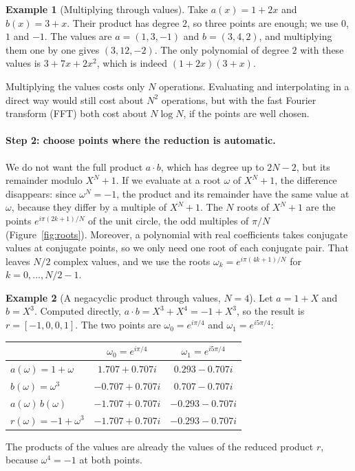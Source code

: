 \documentclass[12pt]{article}
\theoremstyle{plain}
\theoremstyle{definition}
\newtheorem{example}{Example}
\begin{document}
\begin{example}[Multiplying through values]
Take $a(x)=1+2x$ and $b(x)=3+x$. Their product has degree $2$, so three points
are enough; we use $0$, $1$ and $-1$. The values are $a=(1,3,-1)$ and
$b=(3,4,2)$, and multiplying them one by one gives $(3,12,-2)$. The only
polynomial of degree $2$ with these values is $3+7x+2x^2$, which is indeed
$(1+2x)(3+x)$.
\end{example}

Multiplying the values costs only $N$ operations. Evaluating and interpolating
in a direct way would still cost about $N^2$ operations, but with the fast
Fourier transform (FFT) \cite{cooley1965fft} both cost about $N\log N$, if the
points are well chosen.

\paragraph{Step 2: choose points where the reduction is automatic.}
We do not want the full product $a\cdot b$, which has degree up to $2N-2$, but
its remainder modulo $X^N+1$. If we evaluate at a root $\omega$ of $X^N+1$, the
difference disappears: since $\omega^N=-1$, the product and its remainder have
the same value at $\omega$, because they differ by a multiple of $X^N+1$. The
$N$ roots of $X^N+1$ are the points $e^{i\pi(2k+1)/N}$ of the unit circle, the
odd multiples of $\pi/N$ (Figure~\ref{fig:roots}). Moreover, a polynomial with
real coefficients takes conjugate values at conjugate points, so we only need
one root of each conjugate pair. That leaves $N/2$ complex values, and we use
the roots $\omega_k=e^{i\pi(4k+1)/N}$ for $k=0,\dots,N/2-1$.



\begin{example}[A negacyclic product through values, $N=4$]
Let $a=1+X$ and $b=X^3$. Computed directly, $a\cdot b=X^3+X^4=-1+X^3$, so the
result is $r=[-1,0,0,1]$. The two points are $\omega_0=e^{i\pi/4}$ and
$\omega_1=e^{i5\pi/4}$:
\begin{center}
\small
\begin{tabular}{@{}lcc@{}}
\toprule
 & $\omega_0=e^{i\pi/4}$ & $\omega_1=e^{i5\pi/4}$\\
\midrule
$a(\omega)=1+\omega$ & $1.707+0.707i$ & $0.293-0.707i$\\
$b(\omega)=\omega^3$ & $-0.707+0.707i$ & $0.707-0.707i$\\
$a(\omega)\,b(\omega)$ & $-1.707+0.707i$ & $-0.293-0.707i$\\
$r(\omega)=-1+\omega^3$ & $-1.707+0.707i$ & $-0.293-0.707i$\\
\bottomrule
\end{tabular}
\end{center}
The products of the values are already the values of the reduced product $r$,
because $\omega^4=-1$ at both points.
\end{example}
\end{document}
